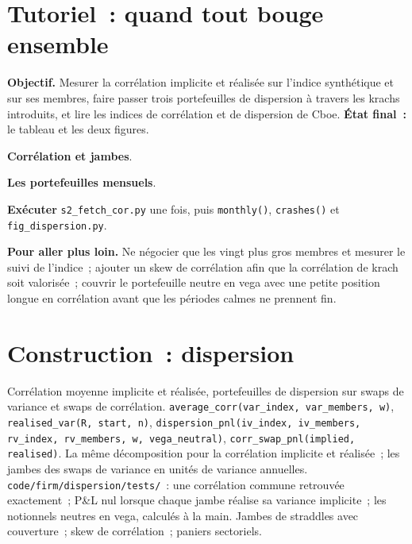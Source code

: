 \section{Tutoriel~: quand tout bouge ensemble}\label{tut:s2:dispersion-and-correlation:tut}

\begin{tutorial}
\textbf{Objectif.} Mesurer la corrélation implicite et réalisée sur l'indice synthétique et sur ses membres, faire passer trois portefeuilles de dispersion à travers les
krachs introduits, et lire les indices de corrélation et de dispersion de Cboe. \textbf{État final~:} le tableau et les deux figures.
\begin{tutsteps}
\item \textbf{Corrélation et jambes}.
\label{lst:s2:dispersion-and-correlation:legs}
\item \textbf{Les portefeuilles mensuels}.
\label{lst:s2:dispersion-and-correlation:books}
\item \textbf{Exécuter} \texttt{s2\_fetch\_cor.py} une fois, puis \texttt{monthly()}, \texttt{crashes()} et \texttt{fig\_dispersion.py}.
\end{tutsteps}
\textbf{Pour aller plus loin.} Ne négocier que les vingt plus gros membres et mesurer le suivi de l'indice~; ajouter un skew de corrélation afin que la corrélation de
krach soit valorisée~; couvrir le portefeuille neutre en vega avec une petite position longue en corrélation avant que les périodes calmes ne prennent fin.
\end{tutorial}

\section{Construction~: dispersion}\label{bld:s2:dispersion-and-correlation:dispersion}

\begin{build}
 Corrélation moyenne implicite et réalisée, portefeuilles de dispersion sur swaps de variance et swaps de corrélation.
 \texttt{average\_corr(var\_index, var\_members, w)}, \texttt{realised\_var(R, start, n)},
\texttt{dispersion\_pnl(iv\_index, iv\_members, rv\_index, rv\_members, w, vega\_neutral)}, \texttt{corr\_swap\_pnl(implied, realised)}.
 La même décomposition pour la corrélation implicite et réalisée~; les jambes des swaps de variance en unités de variance annuelles.
 \texttt{code/firm/dispersion/tests/}~: une corrélation commune retrouvée exactement~; P\&L nul lorsque chaque jambe réalise sa
variance implicite~; les notionnels neutres en vega, calculés à la main.
 Jambes de straddles avec couverture~; skew de corrélation~; paniers sectoriels.
\end{build}

